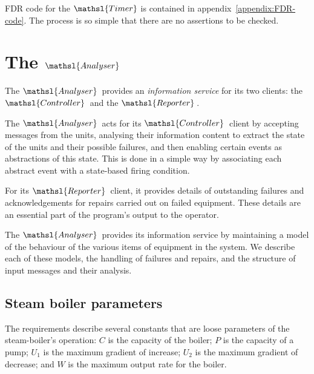 \documentclass{report}
\begin{document}
FDR code for the \( \mathsl{Timer} \)\/ is contained in
appendix~\ref{appendix:FDR-code}.  The process is so simple that there
are no assertions to be checked.


\chapter{The $\mathsl{Analyser}$}

The \( \mathsl{Analyser} \, \)\/ provides an \emph{information
  service} for its two clients: the \( \mathsl{Controller} \, \)\/ and
the \( \mathsl{Reporter} \, \).

The \( \mathsl{Analyser} \, \)\/ acts for its \( \mathsl{Controller}
\, \)\/ client by accepting messages from the units, analysing their
information content to extract the state of the units and their
possible failures, and then enabling certain events as abstractions of
this state.  This is done in a simple way by associating each abstract
event with a state-based firing condition.

For its \( \mathsl{Reporter} \, \)\/ client, it provides details of
outstanding failures and acknowledgements for repairs carried out on
failed equipment.  These details are an essential part of the
program's output to the operator.

The \( \mathsl{Analyser} \, \)\/ provides its information service by
maintaining a model of the behaviour of the various items of equipment
in the system.  We describe each of these models, the handling of
failures and repairs, and the structure of input messages and their
analysis.

\section{Steam boiler parameters}

The requirements describe several constants that are loose parameters
of the steam-boiler's operation: \( C \)\/ is the capacity of the
boiler; \( P \)\/ is the capacity of a pump; \( U_1 \)\/ is the
maximum gradient of increase; \( U_2 \)\/ is the maximum gradient of
decrease; and \( W \)\/ is the maximum output rate for the boiler.
\end{document}
